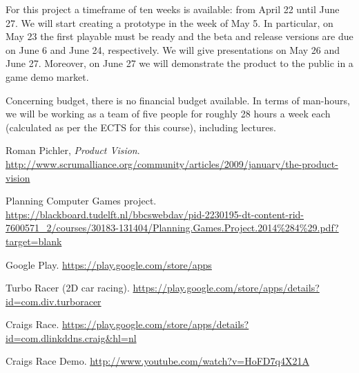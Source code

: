 \documentclass[12pt,twoside,a4paper]{article}
\begin{document}
For this project a timeframe of ten weeks is available: from April 22 until June 27. We will start creating a prototype in the week of May 5. In particular, on May 23 the first playable must be ready and the beta and release versions are due on June 6 and June 24, respectively. We will give presentations on May 26 and June 27. Moreover, on June 27 we will demonstrate the product to the public in a game demo market.

Concerning budget, there is no financial budget available. In terms of man-hours, we will be working as a team of five people for roughly 28 hours a week each (calculated as per the ECTS for this course), including lectures.


\clearpage
\begin{thebibliography}{10}

Roman Pichler, \textit{Product Vision}. \url{http://www.scrumalliance.org/community/articles/2009/january/the-product-vision}

Planning Computer Games project. \url{https://blackboard.tudelft.nl/bbcswebdav/pid-2230195-dt-content-rid-7600571_2/courses/30183-131404/Planning.Games.Project.2014%284%29.pdf?target=blank}

Google Play. \url{https://play.google.com/store/apps}

Turbo Racer (2D car racing). \url{https://play.google.com/store/apps/details?id=com.div.turboracer}

Craigs Race. \url{https://play.google.com/store/apps/details?id=com.dlinkddns.craig&hl=nl}

Craigs Race Demo. \url{http://www.youtube.com/watch?v=HoFD7q4X21A}

\end{thebibliography}
\end{document}
